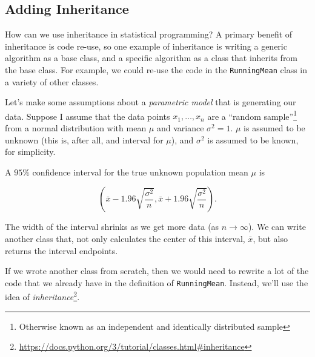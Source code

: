 \documentclass[12pt,krantz2]{krantz}
\renewcommand{\href}[2]{#2\footnote{\url{#1}}}
\begin{document}
\hypertarget{adding-inheritance}{%
\subsection{Adding Inheritance}\label{adding-inheritance}}

How can we use inheritance in statistical programming? A primary benefit of inheritance is code re-use, so one example of inheritance is writing a generic algorithm as a base class, and a specific algorithm as a class that inherits from the base class. For example, we could re-use the code in the \texttt{RunningMean} class in a variety of other classes.

Let's make some assumptions about a \emph{parametric model} that is generating our data. Suppose I assume that the data points \(x_1, \ldots, x_n\) are a ``random sample''\footnote{Otherwise known as an independent and identically distributed sample} from a normal distribution with mean \(\mu\) and variance \(\sigma^2=1\). \(\mu\) is assumed to be unknown (this is, after all, and interval for \(\mu\)), and \(\sigma^2\) is assumed to be known, for simplicity.

A \(95\%\) confidence interval for the true unknown population mean \(\mu\) is

\begin{equation} 
\left( \bar{x} - 1.96 \sqrt{\frac{\sigma^2}{n}}, \bar{x} + 1.96 \sqrt{\frac{\sigma^2}{n}} \right).
\end{equation}

The width of the interval shrinks as we get more data (as \(n \to \infty\)). We can write another class that, not only calculates the center of this interval, \(\bar{x}\), but also returns the interval endpoints.

If we wrote another class from scratch, then we would need to rewrite a lot of the code that we already have in the definition of \texttt{RunningMean}. Instead, we'll use the idea of \href{https://docs.python.org/3/tutorial/classes.html\#inheritance}{\emph{inheritance}}.
\end{document}
